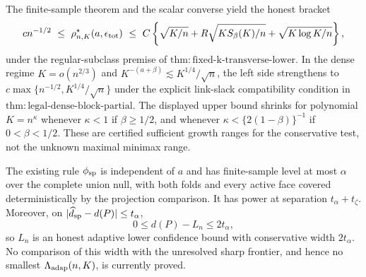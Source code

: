 The finite-sample theorem and the scalar converse yield the honest bracket
\[
 c n^{-1/2}
 \ \le\ \rho^\star_{n,K}(a,\epsilon_{\rm tot})
 \ \le\ C\left\{\sqrt{K/n}+R\sqrt{KS_\beta(K)/n}+\sqrt{K\log K/n}\right\},
\]
under the regular-subclass premise of \(\mathrm{thm:fixed\mbox{-}k\mbox{-}transverse\mbox{-}lower}\).  In the dense regime \(K=o(n^{2/3})\) and \(K^{-(a+\beta)}\lesssim K^{1/4}/\sqrt n\), the left side strengthens to \(c\max\{n^{-1/2},K^{1/4}/\sqrt n\}\) under the explicit link-slack compatibility condition in \(\mathrm{thm:legal\mbox{-}dense\mbox{-}block\mbox{-}partial}\).  The displayed upper bound shrinks for polynomial \(K=n^\kappa\) whenever \(\kappa<1\) if \(\beta\ge1/2\), and whenever \(\kappa<\{2(1-\beta)\}^{-1}\) if \(0<\beta<1/2\).  These are certified sufficient growth ranges for the conservative test, not the unknown maximal minimax range.

The existing rule \(\phi_{\rm sp}\) is independent of \(a\) and has finite-sample level at most \(\alpha\) over the complete union null, with both folds and every active face covered deterministically by the projection comparison.  It has power at separation \(t_\alpha+t_\zeta\).  Moreover, on \(|\widehat d_{\rm sp}-d(P)|\le t_\alpha\),
\[
 0\le d(P)-L_n\le2t_\alpha,
\]
so \(L_n\) is an honest adaptive lower confidence bound with conservative width \(2t_\alpha\).  No comparison of this width with the unresolved sharp frontier, and hence no smallest \(\Lambda_{\rm adap}(n,K)\), is currently proved.

